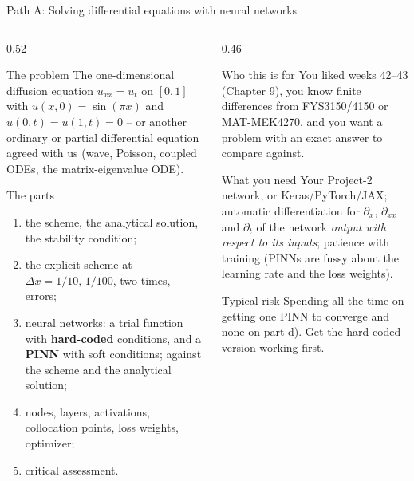 \documentclass[10pt,aspectratio=169]{beamer}
\begin{document}
\begin{frame}{Path A: Solving differential equations with neural networks}
\scriptsize
\begin{columns}[T]
\begin{column}{0.52\textwidth}
\begin{block}{The problem}
The one-dimensional diffusion equation $u_{xx}=u_t$ on $[0,1]$ with
$u(x,0)=\sin(\pi x)$ and $u(0,t)=u(1,t)=0$ -- or another ordinary or
partial differential equation agreed with us (wave, Poisson, coupled ODEs,
the matrix-eigenvalue ODE).
\end{block}
\begin{block}{The parts}
\begin{enumerate}
  \item[a)] the scheme, the analytical solution, the stability condition;
  \item[b)] the explicit scheme at $\Delta x=1/10,\,1/100$, two times, errors;
  \item[c)] neural networks: a trial function with \textbf{hard-coded}
        conditions, and a \textbf{PINN} with soft conditions; against the
        scheme and the analytical solution;
  \item[d)] nodes, layers, activations, collocation points, loss weights,
        optimizer;
  \item[e)] critical assessment.
\end{enumerate}
\end{block}
\end{column}
\begin{column}{0.46\textwidth}
\begin{block}{Who this is for}
You liked weeks 42--43 (Chapter 9), you know finite differences from
FYS3150/4150 or MAT-MEK4270, and you want a problem with an exact answer to
compare against.
\end{block}
\begin{block}{What you need}
Your Project-2 network, or Keras/PyTorch/JAX; automatic differentiation
for $\partial_x$, $\partial_{xx}$ and $\partial_t$ of the network
\emph{output with respect to its inputs}; patience with training
(PINNs are fussy about the learning rate and the loss weights).
\end{block}
\begin{block}{Typical risk}
Spending all the time on getting one PINN to converge and none on part d).
Get the hard-coded version working first.
\end{block}
\end{column}
\end{columns}
\end{frame}
\end{document}
